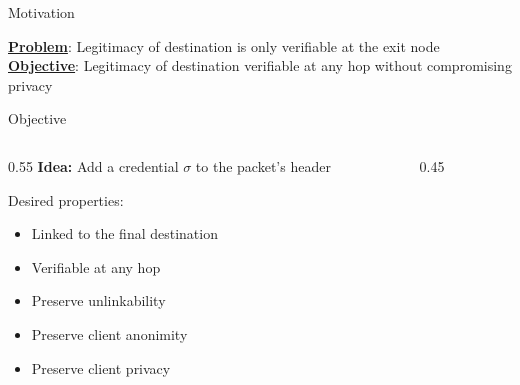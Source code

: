 \begin{frame}{Motivation}
    \begin{figure}%
        \hspace{-10mm}
        \resizebox{0.75\linewidth}{!}{}
    \end{figure}

    \vfill\pause
    \textbf{\underline{Problem}}: Legitimacy of destination is only verifiable at the {\color{red}exit node}\newline
    \vfill\pause
    \textbf{\underline{Objective}}: Legitimacy of destination verifiable at {\color{orange}any hop} without compromising privacy
\end{frame}

\begin{frame}{Objective}
    \begin{columns}
        \begin{column}{0.55\linewidth}
             \textbf{Idea:} Add a {\color{Orchid}credential $\sigma$} to the packet's header \newline

             Desired properties:
             \begin{itemize}
                \item Linked to the final destination
                \item Verifiable at any hop
                \item Preserve unlinkability 
                \item Preserve client anonimity 
                \item Preserve client privacy 
             \end{itemize}
        \end{column}
        \begin{column}{0.45\linewidth}
            \centering
            \resizebox{0.85\linewidth}{!}{}
        \end{column}
    \end{columns}
\end{frame}